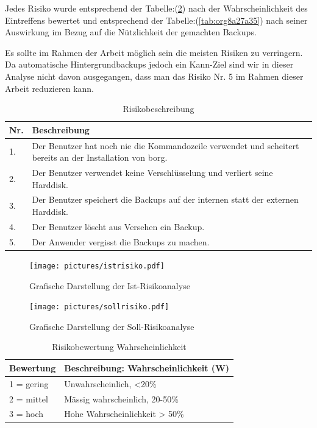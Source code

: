 Jedes Risiko wurde entsprechend der Tabelle:(\ref{tab:orgc24b878}) nach der
Wahrscheinlichkeit des Eintreffens bewertet und entsprechend der
Tabelle:(\ref{tab:org8a27a35}) nach seiner Auswirkung im Bezug auf die
Nützlichkeit der gemachten Backups.

Es sollte im Rahmen der Arbeit möglich sein die meisten Risiken zu verringern.
Da automatische Hintergrundbackups jedoch ein Kann-Ziel sind wir in dieser
Analyse nicht davon ausgegangen, dass man das Risiko Nr. 5 im Rahmen dieser
Arbeit reduzieren kann.
\begin{table}[H]
\centering
\begin{tabular}{|>{\columncolor[HTML]{EFEFEF}}p{}|p{}|}
\hline
\textbf{Nr.}\cellcolor[HTML]{C0C0C0} & \textbf{Beschreibung}\cellcolor[HTML]{C0C0C0}\\
\hline
1. & Der Benutzer hat noch nie die Kommandozeile verwendet und scheitert bereits an der Installation von \gls{borg}.\\
\hline
2. & Der Benutzer verwendet keine Verschlüsselung und verliert seine Harddisk.\\
\hline
3. & Der Benutzer speichert die Backups auf der internen statt der externen Harddisk.\\
\hline
4. & Der Benutzer löscht aus Versehen ein Backup.\\
\hline
5. & Der Anwender vergisst die Backups zu machen.\\
\hline
\end{tabular}
\caption{\label{tab:orgb156d31}
Risikobeschreibung}

\end{table}

\begin{figure}[H]
\centering
\texttt{[image: pictures/istrisiko.pdf]}
\caption{\label{fig:org2c84d03}
Grafische Darstellung der Ist-Risikoanalyse}
\end{figure}

\begin{figure}[H]
\centering
\texttt{[image: pictures/sollrisiko.pdf]}
\caption{\label{fig:org525577a}
Grafische Darstellung der Soll-Risikoanalyse}
\end{figure}


\begin{table}[H]
\centering
\begin{tabular}{l|l}
\textbf{Bewertung} & \textbf{Beschreibung: Wahrscheinlichkeit (W)}\\
\hline
1 = gering & Unwahrscheinlich, <20\%\\
2 = mittel & Mässig wahrscheinlich, 20-50\%\\
3 = hoch & Hohe Wahrscheinlichkeit > 50\%\\
\end{tabular}
\caption{\label{tab:orgc24b878}
Risikobewertung Wahrscheinlichkeit}

\end{table}

